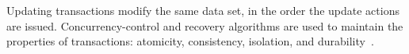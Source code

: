 \label{def:actver}
\label{def:capacity}
\label{def:commitver}
\label{def:entries}
\label{def:kr}
\label{def:vr}
\label{def:maxcomver}
\label{def:maxsplit}
\label{def:minlive}
\label{def:minsplit}
\label{def:movever}
\label{def:rootstar}
\label{def:snapver}
\label{def:stablever}
\label{def:txid}

Updating transactions modify the same data set, in the order the
update actions are issued.
Concurrency-control and recovery algorithms are used to maintain the
\label{def:acid} properties of transactions: 
atomicity, consistency, isolation, and
durability~\cite{gray:1993:transactionprocessing}. 
